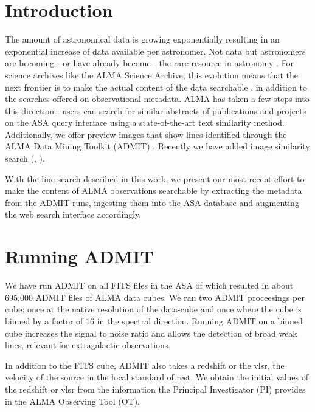 \documentclass[11pt,twoside]{article}
\begin{document}

\section{Introduction}
The amount of astronomical data is growing exponentially \citep[e.g.][]{stoehradass19} resulting in an exponential increase of data available per astronomer. Not data but astronomers are becoming - or have already become - the rare resource in astronomy \citep{stoehradass15}. For science archives like the ALMA Science Archive, this evolution means that the next frontier is to make the actual content of the data searchable \citep{durandadass17}, in addition to the searches offered on observational metadata. ALMA has taken a few steps into this direction \citep{stoehrmessenger23}: users can search for similar abstracts of publications and projects on the ASA query interface using a state-of-the-art text similarity method. Additionally, we offer preview images that show lines identified through the ALMA Data Mining Toolkit (ADMIT) \citep{admit}. Recently we have added image similarity search (\citet{stoehradass23}, \citet{stoehradass25}).

With the line search described in this work, we present our most recent effort to make the content of ALMA observations searchable by extracting the metadata from the ADMIT runs, ingesting them into the ASA database and augmenting the web search interface accordingly.

\section{Running ADMIT}
\label{admit}
We have run ADMIT on all FITS files in the ASA of which resulted in about 695,000 ADMIT files of ALMA data cubes. We ran two ADMIT proceesings per cube: once at the native resolution of the data-cube and once where the cube is binned by a factor of 16 in the spectral direction. Running ADMIT on a binned cube increases the signal to noise ratio and allows the detection of broad weak lines, relevant for extragalactic observations.

In addition to the FITS cube, ADMIT also takes a redshift or the vlsr, the velocity of the source in the local standard of rest. We obtain the initial values of the redshift or vlsr from the information the Principal Investigator (PI) provides in the ALMA Observing Tool (OT).
\end{document}
